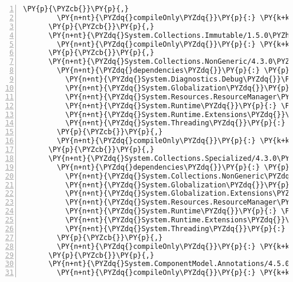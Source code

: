 \begin{Verbatim}[commandchars=\\\{\},numbers=left,firstnumber=1,stepnumber=1,numberblanklines=0]
        \PY{p}{\PYZcb{}}\PY{p}{,}
        \PY{n+nt}{\PYZdq{}compileOnly\PYZdq{}}\PY{p}{:} \PY{k+kc}{true}
      \PY{p}{\PYZcb{}}\PY{p}{,}
      \PY{n+nt}{\PYZdq{}System.Collections.Immutable/1.5.0\PYZhy{}rc1\PYZdq{}}\PY{p}{:} \PY{p}{\PYZob{}}
        \PY{n+nt}{\PYZdq{}compileOnly\PYZdq{}}\PY{p}{:} \PY{k+kc}{true}
      \PY{p}{\PYZcb{}}\PY{p}{,}
      \PY{n+nt}{\PYZdq{}System.Collections.NonGeneric/4.3.0\PYZdq{}}\PY{p}{:} \PY{p}{\PYZob{}}
        \PY{n+nt}{\PYZdq{}dependencies\PYZdq{}}\PY{p}{:} \PY{p}{\PYZob{}}
          \PY{n+nt}{\PYZdq{}System.Diagnostics.Debug\PYZdq{}}\PY{p}{:} \PY{l+s+s2}{\PYZdq{}4.3.0\PYZdq{}}\PY{p}{,}
          \PY{n+nt}{\PYZdq{}System.Globalization\PYZdq{}}\PY{p}{:} \PY{l+s+s2}{\PYZdq{}4.3.0\PYZdq{}}\PY{p}{,}
          \PY{n+nt}{\PYZdq{}System.Resources.ResourceManager\PYZdq{}}\PY{p}{:} \PY{l+s+s2}{\PYZdq{}4.3.0\PYZdq{}}\PY{p}{,}
          \PY{n+nt}{\PYZdq{}System.Runtime\PYZdq{}}\PY{p}{:} \PY{l+s+s2}{\PYZdq{}4.3.0\PYZdq{}}\PY{p}{,}
          \PY{n+nt}{\PYZdq{}System.Runtime.Extensions\PYZdq{}}\PY{p}{:} \PY{l+s+s2}{\PYZdq{}4.3.0\PYZdq{}}\PY{p}{,}
          \PY{n+nt}{\PYZdq{}System.Threading\PYZdq{}}\PY{p}{:} \PY{l+s+s2}{\PYZdq{}4.3.0\PYZdq{}}
        \PY{p}{\PYZcb{}}\PY{p}{,}
        \PY{n+nt}{\PYZdq{}compileOnly\PYZdq{}}\PY{p}{:} \PY{k+kc}{true}
      \PY{p}{\PYZcb{}}\PY{p}{,}
      \PY{n+nt}{\PYZdq{}System.Collections.Specialized/4.3.0\PYZdq{}}\PY{p}{:} \PY{p}{\PYZob{}}
        \PY{n+nt}{\PYZdq{}dependencies\PYZdq{}}\PY{p}{:} \PY{p}{\PYZob{}}
          \PY{n+nt}{\PYZdq{}System.Collections.NonGeneric\PYZdq{}}\PY{p}{:} \PY{l+s+s2}{\PYZdq{}4.3.0\PYZdq{}}\PY{p}{,}
          \PY{n+nt}{\PYZdq{}System.Globalization\PYZdq{}}\PY{p}{:} \PY{l+s+s2}{\PYZdq{}4.3.0\PYZdq{}}\PY{p}{,}
          \PY{n+nt}{\PYZdq{}System.Globalization.Extensions\PYZdq{}}\PY{p}{:} \PY{l+s+s2}{\PYZdq{}4.3.0\PYZdq{}}\PY{p}{,}
          \PY{n+nt}{\PYZdq{}System.Resources.ResourceManager\PYZdq{}}\PY{p}{:} \PY{l+s+s2}{\PYZdq{}4.3.0\PYZdq{}}\PY{p}{,}
          \PY{n+nt}{\PYZdq{}System.Runtime\PYZdq{}}\PY{p}{:} \PY{l+s+s2}{\PYZdq{}4.3.0\PYZdq{}}\PY{p}{,}
          \PY{n+nt}{\PYZdq{}System.Runtime.Extensions\PYZdq{}}\PY{p}{:} \PY{l+s+s2}{\PYZdq{}4.3.0\PYZdq{}}\PY{p}{,}
          \PY{n+nt}{\PYZdq{}System.Threading\PYZdq{}}\PY{p}{:} \PY{l+s+s2}{\PYZdq{}4.3.0\PYZdq{}}
        \PY{p}{\PYZcb{}}\PY{p}{,}
        \PY{n+nt}{\PYZdq{}compileOnly\PYZdq{}}\PY{p}{:} \PY{k+kc}{true}
      \PY{p}{\PYZcb{}}\PY{p}{,}
      \PY{n+nt}{\PYZdq{}System.ComponentModel.Annotations/4.5.0\PYZhy{}rc1\PYZdq{}}\PY{p}{:} \PY{p}{\PYZob{}}
        \PY{n+nt}{\PYZdq{}compileOnly\PYZdq{}}\PY{p}{:} \PY{k+kc}{true}

\end{Verbatim}
